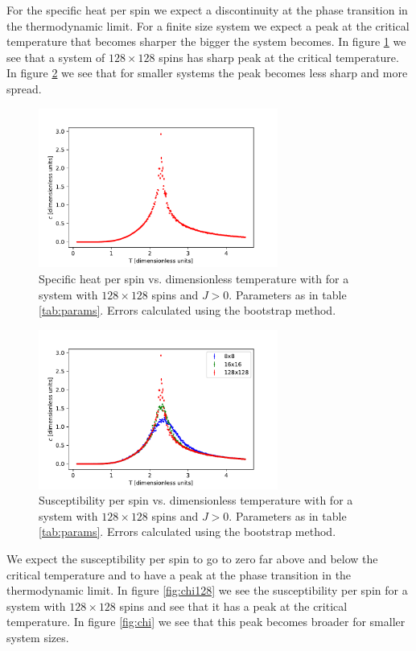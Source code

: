 \documentclass[10 pt, a4paper]{article}
\begin{document}
For the specific heat per spin we expect a discontinuity at the phase transition in the thermodynamic limit. For a finite size system we expect a peak at the critical temperature that becomes sharper the bigger the system becomes. In figure \ref{fig:cv128} we see that a system of $128 \times 128$ spins has sharp peak at the critical temperature. In figure \ref{fig:cv} we see that for smaller systems the peak becomes less sharp and more spread.

\begin{figure}[H]
\centering
\includegraphics[width=0.7\textwidth]{cv128}
\caption{Specific heat per spin vs. dimensionless temperature with for a system with $128 \times 128$ spins and $J > 0$. Parameters as in table \ref{tab:params}. Errors calculated using the bootstrap method. \label{fig:cv128}}
\end{figure}

\begin{figure}[H]
\centering
\includegraphics[width=0.7\textwidth]{cv}
\caption{Susceptibility per spin vs. dimensionless temperature with for a system with $128 \times 128$ spins and $J > 0$. Parameters as in table \ref{tab:params}. Errors calculated using the bootstrap method. \label{fig:cv}}
\end{figure}

We expect the susceptibility per spin to go to zero far above and below the critical temperature and to have a peak at the phase transition in the thermodynamic limit. In figure \ref{fig:chi128} we see the susceptibility per spin for a system with $128 \times 128$ spins and see that it has a peak at the critical temperature. In figure \ref{fig:chi} we see that this peak becomes broader for smaller system sizes. 
\end{document}
